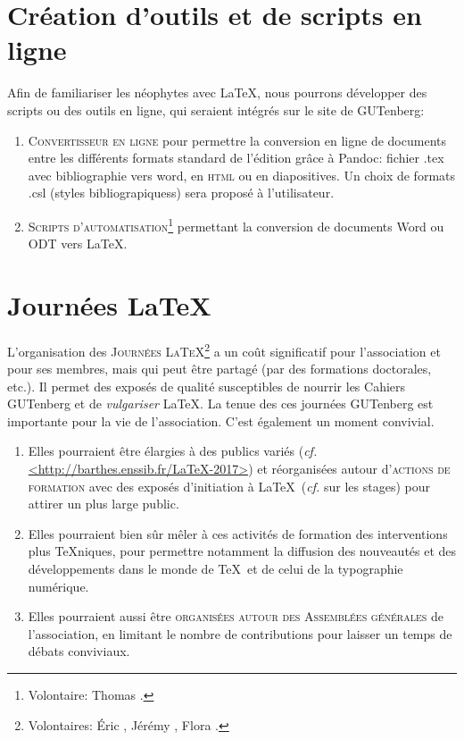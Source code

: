 \documentclass{tufte-handout}
\newcommand{\ratio}[3][]{\marginpar{\footnotesize{\textcolor{teal}{Temps requis: #2 / Utilité: #3}\par\noindent \textcolor{teal}{#1}}}}
\begin{document}
\section{Création d'outils et de scripts en ligne}

Afin de familiariser les néophytes avec \LaTeX\ratio[Petites contributions, par les connaisseurs]{++}{+++}, nous pourrons développer des scripts ou des outils en ligne, qui seraient intégrés sur le site de GUTenberg:

\begin{enumerate}
	\item\textsc{Convertisseur en ligne} pour permettre la conversion en ligne de documents entre les différents formats standard de l'édition grâce à Pandoc: fichier .tex avec bibliographie vers word, en \textsc{html} ou en diapositives. Un choix de formats .csl (styles bibliograpiquess) sera  proposé à l'utilisateur.
	\item\textsc{Scripts d'automatisation}\footnote{Volontaire: Thomas .} permettant la conversion de documents Word ou ODT vers \LaTeX.
\end{enumerate}


\section{Journées \LaTeX}

L'organisation des \textsc{Journées \LaTeX}\ratio[Coûteuses, mais utiles et susceptibles de s'intégrer dans les autres projets]{+++}{+++}\footnote{Volontaires: Éric , Jérémy , Flora .} a un coût significatif pour l'association et pour ses membres, mais qui peut être partagé (par des formations doctorales, etc.). Il permet des exposés de qualité susceptibles de nourrir les Cahiers GUTenberg et de \emph{vulgariser} \LaTeX. La tenue des ces journées GUTenberg est importante pour la vie de l'association. C'est également un moment convivial.

\begin{enumerate}
	\item Elles pourraient être élargies à des publics variés (\emph{cf.} \url{<http://barthes.enssib.fr/LaTeX-2017>}) et réorganisées autour d'\textsc{actions de formation} avec des exposés d'initiation à \LaTeX\ (\emph{cf.} sur les stages) pour attirer un plus large public.
	\item Elles pourraient bien sûr mêler à ces activités de formation des interventions plus \TeX niques, pour permettre notamment la diffusion des nouveautés et des développements dans le monde de \TeX\ et de celui de la typographie numérique.
	\item Elles pourraient aussi être \textsc{organisées autour des Assemblées générales} de l'association, en limitant le nombre de contributions pour laisser un temps de débats conviviaux.
\end{enumerate}
\end{document}
